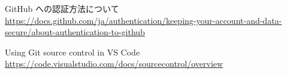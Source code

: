 \documentclass[aspectratio=169,dvipdfmx,cjk]{beamer}
\newcommand{\cmdline}[1]{
    \colorbox{lightgray}{\lstinline[style=command]{#1}}
}
\newcommand{\blue}[1]{ {\color{blue} #1} }
\begin{document}
\begin{frame}{\insertsection}
\begin{thebibliography}{99}

   GitHub への認証方法について\\
  \href{https://docs.github.com/ja/authentication/keeping-your-account-and-data-secure/about-authentication-to-github
  }{https://docs.github.com/ja/authentication/keeping-your-account-and-data-secure/about-authentication-to-github}


   Using Git source control in VS Code\\
  \href{https://code.visualstudio.com/docs/sourcecontrol/overview
  }{https://code.visualstudio.com/docs/sourcecontrol/overview}

  \end{thebibliography}
\end{frame}

\end{document}

